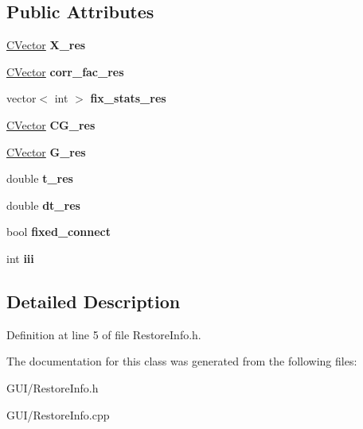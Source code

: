 \subsection*{Public Attributes}
\begin{DoxyCompactItemize}
\item 
\mbox{\label{class_c_restore_info_a3b49707a99af1c0b026077c42e324669}} 
\hyperlink{class_c_vector}{C\+Vector} {\bfseries X\+\_\+res}
\item 
\mbox{\label{class_c_restore_info_a8880a6545b2062cfabd54fc5100a8ac2}} 
\hyperlink{class_c_vector}{C\+Vector} {\bfseries corr\+\_\+fac\+\_\+res}
\item 
\mbox{\label{class_c_restore_info_a3303a755b2fffa13ae5926dad6fa061d}} 
vector$<$ int $>$ {\bfseries fix\+\_\+stats\+\_\+res}
\item 
\mbox{\label{class_c_restore_info_ade271931cd5d7d8cf9bb145a45edd37e}} 
\hyperlink{class_c_vector}{C\+Vector} {\bfseries C\+G\+\_\+res}
\item 
\mbox{\label{class_c_restore_info_ab3c501b4dfe3d0f1fa208d07f4f47328}} 
\hyperlink{class_c_vector}{C\+Vector} {\bfseries G\+\_\+res}
\item 
\mbox{\label{class_c_restore_info_a4208a2e67ec25627dbee3b465914f81f}} 
double {\bfseries t\+\_\+res}
\item 
\mbox{\label{class_c_restore_info_a3cf1910d46c9a99b7169f869ae2cc49e}} 
double {\bfseries dt\+\_\+res}
\item 
\mbox{\label{class_c_restore_info_a14e25a5fe3ff43443cbaac089d721223}} 
bool {\bfseries fixed\+\_\+connect}
\item 
\mbox{\label{class_c_restore_info_ac2b8053299c584d8fd9937f48eda761c}} 
int {\bfseries iii}
\end{DoxyCompactItemize}


\subsection{Detailed Description}


Definition at line 5 of file Restore\+Info.\+h.



The documentation for this class was generated from the following files\+:\begin{DoxyCompactItemize}
\item 
G\+U\+I/Restore\+Info.\+h\item 
G\+U\+I/Restore\+Info.\+cpp\end{DoxyCompactItemize}
